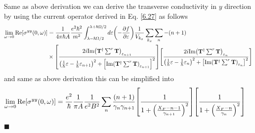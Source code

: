 \noindent
Same as above derivation we can derive the transverse conductivity in $y$ direction by using the current operator derived in Eq. \eqref{6.27} as follows
\begin{equation} \label{7.24}
  \begin{aligned}
    \lim_{\omega \to 0}
    \text{Re}[{\sigma}^{yy}(0,\omega)] & =
    \frac{1}{4\pi\hbar A}
    \frac{e^2\hbar^2}{{m^2}}
    \int_{\lambda-\hbar\Omega/2}^{\lambda+ \hbar\Omega/2} d\varepsilon
    \qty(
    -\frac{\partial f}{\partial \varepsilon})
    \frac{1}{V_{k_x}} \sum_{k_x} \sum_{n}
    -\qty(n+1)
    \\
    & \times
    \qty[
    \frac{2i \text{Im}\qty(\mathbf{T}^{\dagger} \sum^r \mathbf{T})_{\varepsilon_{n+1}}
    }
    {
    \qty(
    \frac{1}{\hbar}\varepsilon -
    \frac{1}{\hbar}\varepsilon_{n+1}
    )^2
    + \qty[\text{Im}\qty(\mathbf{T}^{\dagger} \sum^r \mathbf{T})_{\varepsilon_{n+1}}]^2
    }]
    \qty[
    \frac{2i \text{Im}\qty(\mathbf{T}^{\dagger} \sum^r \mathbf{T})_{\varepsilon_{n}}
    }
    {
    \qty(
    \frac{1}{\hbar}\varepsilon -
    \frac{1}{\hbar}\varepsilon_{n}
    )^2
    + \qty[\text{Im}\qty(\mathbf{T}^{\dagger} \sum^r \mathbf{T})_{\varepsilon_{n}}]^2
    }]
  \end{aligned}
\end{equation}
and same as above derivation this can be simplified into
\begin{equation} \label{7.25}
  \begin{aligned}
    \lim_{\omega \to 0}
    \text{Re}[{\sigma}^{yy}(0,\omega)] & =
    \frac{e^2}{\hbar}
    \frac{1}{\pi A}
    \frac{1}{e^2B^2}
    \sum_{n}
    \frac{\qty(n+1)}{\gamma_{n}\gamma_{n+1}}
    \qty[
      \frac{1}
      {
        1 + \qty(\frac{X_F - n -1}{\gamma_{n+1}})^2
      }
    ]
    \qty[
      \frac{1}
      {
        1 + \qty(\frac{X_F - n}{\gamma_{n}})^2
      }
    ]
  \end{aligned}
\end{equation}













\hfill$\blacksquare$
